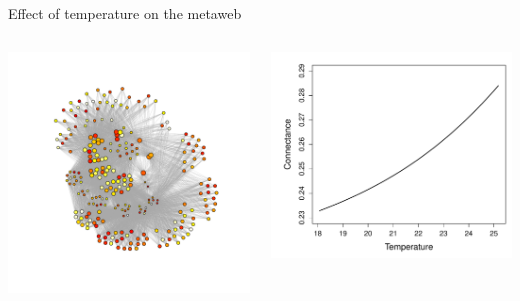 \documentclass{eecslides}
\begin{document}
	\begin{frame}{Effect of temperature on the metaweb}
 	    	\begin{columns}
			\begin{column}{0.4\textwidth}							
					\includegraphics[height=0.7\textheight]{graph_mw}\\	
			\end{column}
			\begin{column}{0.6\textwidth}
				\begin{center}
					\includegraphics[height=0.5\textheight]{ConnectanceTemp}\\	
				\end{center}
			\end{column}				
		\end{columns}	   
	\end{frame}
\end{document}
